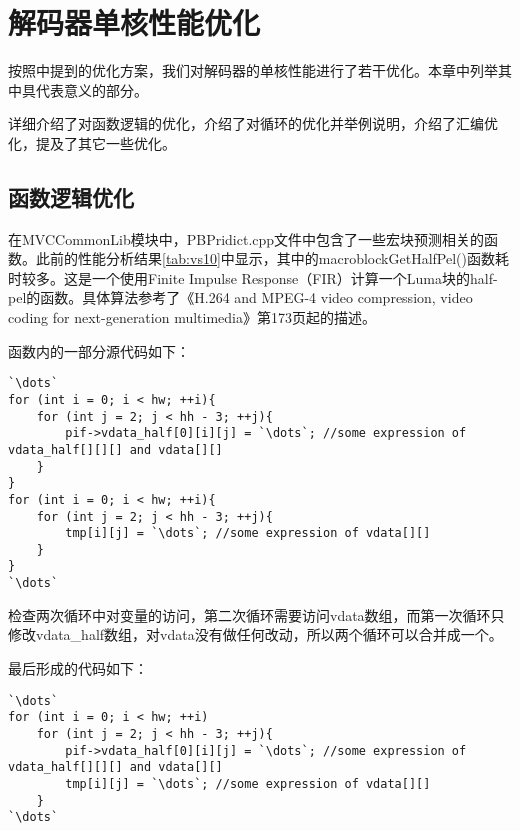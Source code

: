 

\chapter{解码器单核性能优化}
\label{cha:singlecoreopt}

按照中提到的优化方案，我们对解码器的单核性能进行了若干优化。本章中列举其中具代表意义的部分。

详细介绍了对函数逻辑的优化，介绍了对循环的优化并举例说明，介绍了汇编优化，提及了其它一些优化。

\section{函数逻辑优化}
\label{sec:singlecorelogicopt}

在MVCCommonLib模块中，PBPridict.cpp文件中包含了一些宏块预测相关的函数。此前的性能分析结果\autoref{tab:vs10}中显示，其中的macroblockGetHalfPel()函数耗时较多。这是一个使用Finite Impulse Response（FIR）计算一个Luma块的half-pel的函数。具体算法参考了《H.264 and MPEG-4 video compression, video coding for next-generation multimedia》\cite{richardson2003h}第173页起的描述。

函数内的一部分源代码如下：
\begin{lstlisting}[caption = {macroblockGetHalfPel()函数片段（优化前）}, label = lst:macroblockGetHalfPelorig]
`\dots`
for (int i = 0; i < hw; ++i){
	for (int j = 2; j < hh - 3; ++j){
		pif->vdata_half[0][i][j] = `\dots`; //some expression of vdata_half[][][] and vdata[][]
	}
}
for (int i = 0; i < hw; ++i){
	for (int j = 2; j < hh - 3; ++j){
		tmp[i][j] = `\dots`; //some expression of vdata[][]
	}
}
`\dots`
\end{lstlisting}

检查两次循环中对变量的访问，第二次循环需要访问vdata数组，而第一次循环只修改vdata\_half数组，对vdata没有做任何改动，所以两个循环可以合并成一个。

最后形成的代码如下：

\begin{lstlisting}[caption = {macroblockGetHalfPel()函数片段（优化后）}, label = lst:macroblockGetHalfPelopt]
`\dots`
for (int i = 0; i < hw; ++i)
	for (int j = 2; j < hh - 3; ++j){
		pif->vdata_half[0][i][j] = `\dots`; //some expression of vdata_half[][][] and vdata[][]
		tmp[i][j] = `\dots`; //some expression of vdata[][]
	}
`\dots`
\end{lstlisting}

